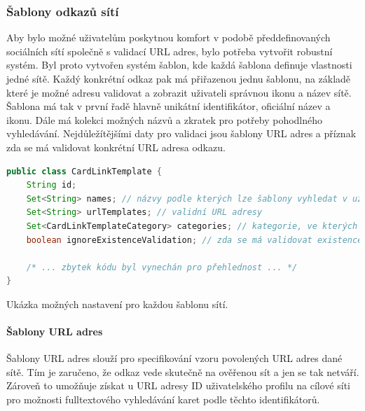 \begin{itemize}
\begin{itemize}
		\subsubsection{Šablony odkazů sítí}

		Aby bylo možné uživatelům poskytnou komfort v podobě předdefinovaných sociálních sítí společně s validací \ac{URL} adres,
		bylo potřeba vytvořit robustní systém.
		Byl proto vytvořen systém šablon, kde každá šablona definuje vlastnosti jedné sítě.
		Každý konkrétní odkaz pak má přiřazenou jednu šablonu, na základě které je možné adresu validovat a
		zobrazit uživateli správnou ikonu a název sítě.
		Šablona má tak v první řadě hlavně unikátní identifikátor, oficiální název a ikonu.
		Dále má kolekci možných názvů a zkratek pro potřeby pohodlného vyhledávání.
		Nejdůležítějšími daty pro validaci jsou šablony \ac{URL} adres a příznak zda se má validovat konkrétní \ac{URL} adresa odkazu.

		\begin{lstlisting}[language=Java]
public class CardLinkTemplate {
    String id;
    Set<String> names; // názvy podle kterých lze šablony vyhledat v uživatelské administraci
    Set<String> urlTemplates; // validní URL adresy
    Set<CardLinkTemplateCategory> categories; // kategorie, ve kterých lze šablonu vyhledat
    boolean ignoreExistenceValidation; // zda se má validovat existence odkazu s touto šablonou

    /* ... zbytek kódu byl vynechán pro přehlednost ... */
}
		\end{lstlisting}
		Ukázka možných nastavení pro každou šablonu sítí. %

			\paragraph{Šablony URL adres}

			Šablony \ac{URL} adres slouží pro specifikování vzoru povolených \ac{URL} adres dané sítě.
			Tím je zaručeno, že odkaz vede skutečně na ověřenou sít a jen se tak netváří.
			Zároveň to umožňuje získat u \ac{URL} adresy ID uživatelského profilu na cílové síti pro možnosti fulltextového
			vyhledávání karet podle těchto identifikátorů.


\end{itemize}
\end{itemize}

